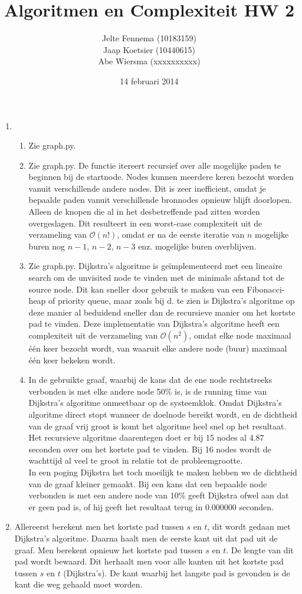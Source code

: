 \documentclass[11pt]{article}
\title{\textbf{Algoritmen en Complexiteit HW 2}}
\author{Jelte Fennema (10183159)\\
		Jaap Koetsier (10440615)\\
        Abe Wiersma (xxxxxxxxxx)}
\date{14 februari 2014}
\newcommand{\bigO}{\ensuremath{\mathcal{O}}}
\begin{document}
\maketitle

\begin{enumerate}
    \item
        \begin{enumerate}
            \item Zie graph.py.
            \item Zie graph.py. De functie itereert recursief over alle mogelijke paden te beginnen bij de startnode. Nodes kunnen meerdere keren bezocht worden vanuit verschillende andere nodes. Dit is zeer inefficient, omdat je bepaalde paden vanuit verschillende bronnodes opnieuw blijft doorlopen. Alleen de knopen die al in het desbetreffende pad zitten worden overgeslagen. Dit resulteert in een worst-case complexiteit uit de verzameling van $\bigO(n!)$, omdat er na de eerste iteratie van $n$ mogelijke buren nog $n-1$, $n-2$, $n-3$ enz. mogelijke buren overblijven.
            \item Zie graph.py. Dijkstra's algoritme is geïmplementeerd met een lineaire search om de unvisited node te vinden met de minimale afstand tot de source node. Dit kan sneller door gebruik te maken van een Fibonacci-heap of priority queue, maar zoals bij d. te zien is Dijkstra's algoritme op deze manier al beduidend sneller dan de recursieve manier om het kortste pad te vinden. Deze implementatie van Dijkstra's algoritme heeft een complexiteit uit de verzameling van $\bigO(n^2)$, omdat elke node maximaal één keer bezocht wordt, van waaruit elke andere node (buur) maximaal één keer bekeken wordt.
            \item In de gebruikte graaf, waarbij de kans dat de ene node rechtstreeks verbonden is met elke andere node 50\% is, is de running time van Dijkstra's algoritme onmeetbaar op de systeemklok. Omdat Dijkstra's algoritme direct stopt wanneer de doelnode bereikt wordt, en de dichtheid van de graaf vrij groot is komt het algoritme heel snel op het resultaat. Het recursieve algoritme daarentegen doet er bij 15 nodes al 4.87 seconden over om het kortste pad te vinden. Bij 16 nodes wordt de wachttijd al veel te groot in relatie tot de probleemgrootte.\\
            In een poging Dijkstra het toch moeilijk te maken hebben we de dichtheid van de graaf kleiner gemaakt. Bij een kans dat een bepaalde node verbonden is met een andere node van 10\% geeft Dijkstra ofwel aan dat er geen pad is, of hij geeft het resultaat terug in 0.000000 seconden.
        \end{enumerate}
    \item
        Allereerst berekent men het kortste pad tussen $s$ en $t$, dit wordt
        gedaan met Dijkstra's algoritme. Daarna haalt men de eerste kant uit dat
        pad uit de graaf. Men berekent opnieuw het kortste pad tussen $s$ en
        $t$. De lengte van dit pad wordt bewaard. Dit herhaalt men voor alle
        kanten uit het kortste pad tussen $s$ en $t$ (Dijkstra's). De kant waarbij het
        langste pad is gevonden is de kant die weg gehaald moet worden.


\end{enumerate}
\end{document}
